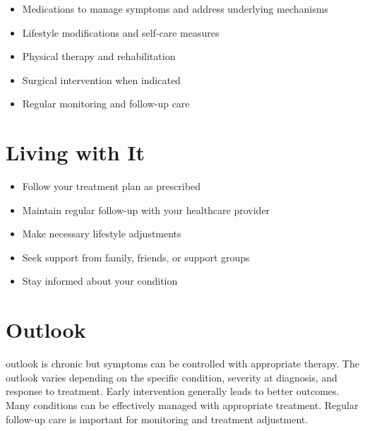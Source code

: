 \begin{itemize}[noitemsep]
  \item Medications to manage symptoms and address underlying mechanisms
  \item Lifestyle modifications and self-care measures
  \item Physical therapy and rehabilitation
  \item Surgical intervention when indicated
  \item Regular monitoring and follow-up care
\end{itemize}
\section{Living with It}
\begin{itemize}[noitemsep]
  \item Follow your treatment plan as prescribed
  \item Maintain regular follow-up with your healthcare provider
  \item Make necessary lifestyle adjustments
  \item Seek support from family, friends, or support groups
  \item Stay informed about your condition
\end{itemize}
\section{Outlook}
outlook is chronic but symptoms can be controlled with appropriate therapy. The outlook varies depending on the specific condition, severity at diagnosis, and response to treatment. Early intervention generally leads to better outcomes. Many conditions can be effectively managed with appropriate treatment. Regular follow-up care is important for monitoring and treatment adjustment.
